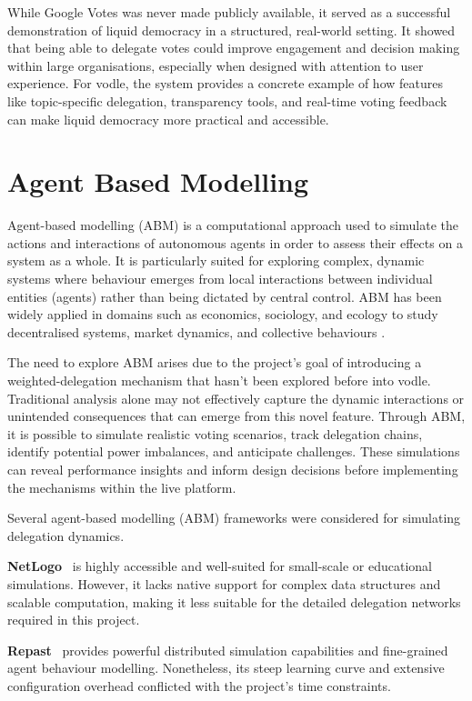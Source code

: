 While Google Votes was never made publicly available, it served as a successful demonstration of liquid democracy in a structured, real-world setting. It showed that being able to delegate votes could improve engagement and decision making within large organisations, especially when designed with attention to user experience. For vodle, the system provides a concrete example of how features like topic-specific delegation, transparency tools, and real-time voting feedback can make liquid democracy more practical and accessible.
\section{Agent Based Modelling}\label{sec:background_abm}
Agent-based modelling (ABM) is a computational approach used to simulate the actions and interactions of autonomous agents in order to assess their effects on a system as a whole. It is particularly suited for exploring complex, dynamic systems where behaviour emerges from local interactions between individual entities (agents) rather than being dictated by central control. ABM has been widely applied in domains such as economics, sociology, and ecology to study decentralised systems, market dynamics, and collective behaviours \citep{bonabeau2002agent}.

The need to explore ABM arises due to the project's goal of introducing a weighted-delegation mechanism that hasn't been explored before into vodle. Traditional analysis alone may not effectively capture the dynamic interactions or unintended consequences that can emerge from this novel feature. Through ABM, it is possible to simulate realistic voting scenarios, track delegation chains, identify potential power imbalances, and anticipate challenges. These simulations can reveal performance insights and inform design decisions before implementing the mechanisms within the live platform.

Several agent-based modelling (ABM) frameworks were considered for simulating delegation dynamics.

\textbf{NetLogo}~\citep{netlogo} is highly accessible and well-suited for small-scale or educational simulations. However, it lacks native support for complex data structures and scalable computation, making it less suitable for the detailed delegation networks required in this project.

\textbf{Repast}~\citep{repast} provides powerful distributed simulation capabilities and fine-grained agent behaviour modelling. Nonetheless, its steep learning curve and extensive configuration overhead conflicted with the project's time constraints.

